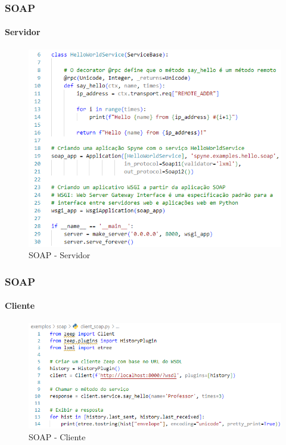 \documentclass[
	9pt, %
	t, %
]{beamer}
\begin{document}
\begin{frame}[fragile]
	\frametitle{SOAP}
	\framesubtitle{Servidor}
	
	\begin{figure}
		\includegraphics[width=0.7\linewidth]{server_soap.PNG}
		\caption{SOAP - Servidor}
		\label{fig:soap_server}
	\end{figure}

\end{frame}

\begin{frame}[fragile]
	\frametitle{SOAP}
	\framesubtitle{Cliente}
	
	\begin{figure}
		\includegraphics[width=0.9\linewidth]{client_soap.PNG}
		\caption{SOAP - Cliente}
		\label{fig:soap_client}
	\end{figure}

\end{frame}
\end{document}
